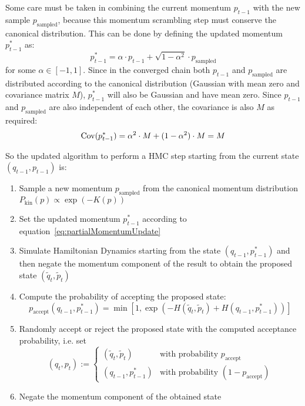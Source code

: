 Some care must be taken in combining the current momentum $p_{t-1}$ with the new sample $p_\textrm{sampled}$, because this momentum scrambling step must conserve the canonical distribution. This can be done by defining the updated momentum $p^*_{t-1}$ as:
\begin{equation} \label{eq:partialMomentumUpdate}
p^*_{t-1} = \alpha \cdot p_{t-1} + \sqrt{1 - \alpha ^2} \cdot p_\textrm{sampled}
\end{equation}
for some $\alpha \in [-1, 1]$. Since in the converged chain both $p_{t-1}$ and $p_\textrm{sampled}$ are distributed according to the canonical distribution (Gaussian with mean zero and covariance matrix $M$), $p^*_{t-1}$ will also be Gaussian and have mean zero. Since $p_{t-1}$ and $p_\textrm{sampled}$ are also independent of each other, the covariance is also $M$ as required:
\begin{equation}
\mathrm{Cov}(p^*_{t-1}) = \alpha^2 \cdot M + (1 - \alpha ^2) \cdot M = M
\end{equation}

So the updated algorithm to perform a HMC step starting from the current state $(q_{t-1}, p_{t-1})$ is: \label{sec:FullHMCAlgorithm}
\begin{enumerate}
\item Sample a new momentum $p_\textrm{sampled}$ from the canonical momentum distribution $P_\textrm{kin}(p) \propto \exp{(-K(p))}$
\item Set the updated momentum $p^*_{t-1}$ according to equation~\eqref{eq:partialMomentumUpdate}
\item Simulate Hamiltonian Dynamics starting from the state $(q_{t-1}, p^*_{t-1})$ and then negate the momentum component of the result to obtain the proposed state $(\tilde{q}_t, \tilde{p}_t)$
\item Compute the probability of accepting the proposed state:
\begin{equation} \label{eq:AcceptanceProbability}
p_{\textrm{accept}}(q_{t-1}, p^*_{t-1}) = \min[1, \exp(-H(\tilde{q}_t, \tilde{p}_t) + H(q_{t-1}, p^*_{t-1}))]
\end{equation}
\item Randomly accept or reject the proposed state with the computed acceptance probability, i.e. set
\begin{equation} \label{eq:StateAfterAcceptReject}
(q_t, p_t) := \begin{cases} (\tilde{q}_t, \tilde{p}_t) & \textrm{with probability } p_{\textrm{accept}} \\ 
											(q_{t-1}, p^*_{t-1}) 			& \textrm{with probability } (1 - p_{\textrm{accept}})
					  \end{cases}
\end{equation}
\item Negate the momentum component of the obtained state
\end{enumerate} %

